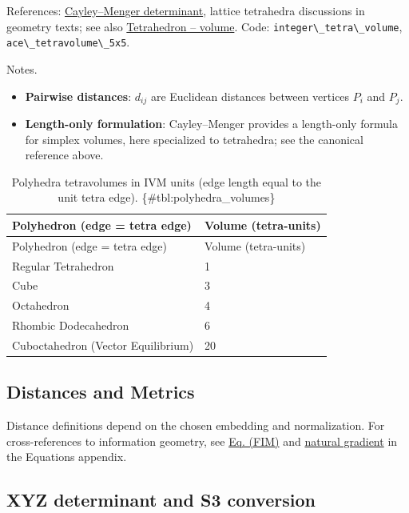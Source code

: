 \documentclass[
  10pt,
]{article}
\newcommand{\passthrough}[1]{#1}
\providecommand{\tightlist}{%
  \setlength{\itemsep}{0pt}\setlength{\parskip}{0pt}}
\begin{document}
References:
\href{https://en.wikipedia.org/wiki/Cayley\%E2\%80\%93Menger_determinant}{Cayley--Menger
determinant}, lattice tetrahedra discussions in geometry texts; see also
\href{https://en.wikipedia.org/wiki/Tetrahedron\#Volume}{Tetrahedron --
volume}. Code: \passthrough{\lstinline!integer\_tetra\_volume!},
\passthrough{\lstinline!ace\_tetravolume\_5x5!}.

Notes.

\begin{itemize}
\tightlist
\item
  \textbf{Pairwise distances}: \(d_{ij}\) are Euclidean distances
  between vertices \(P_i\) and \(P_j\).
\item
  \textbf{Length-only formulation}: Cayley--Menger provides a
  length-only formula for simplex volumes, here specialized to
  tetrahedra; see the canonical reference above.
\end{itemize}

\begin{longtable}[]{@{}ll@{}}
\caption{Polyhedra tetravolumes in IVM units (edge length equal to the
unit tetra edge). \{\#tbl:polyhedra\_volumes\}}\tabularnewline
\toprule
Polyhedron (edge = tetra edge) & Volume (tetra-units)\tabularnewline
\midrule
\endfirsthead
\toprule
Polyhedron (edge = tetra edge) & Volume (tetra-units)\tabularnewline
\midrule
\endhead
Regular Tetrahedron & 1\tabularnewline
Cube & 3\tabularnewline
Octahedron & 4\tabularnewline
Rhombic Dodecahedron & 6\tabularnewline
Cuboctahedron (Vector Equilibrium) & 20\tabularnewline
\bottomrule
\end{longtable}

\hypertarget{distances-and-metrics}{%
\subsection{Distances and Metrics}\label{distances-and-metrics}}

Distance definitions depend on the chosen embedding and normalization.
For cross-references to information geometry, see
\href{08_equations_appendix.md\#eq:fim}{Eq. (FIM)} and
\href{08_equations_appendix.md\#eq:natgrad}{natural gradient} in the
Equations appendix.

\hypertarget{sec:xyz_conversion}{%
\subsection{XYZ determinant and S3
conversion}\label{sec:xyz_conversion}}
\end{document}
